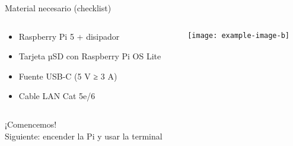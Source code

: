\documentclass[aspectratio=169, professionalfonts]{beamer}
\begin{document}
\begin{frame}{Material necesario (checklist)}
  \begin{columns}[T]
    \begin{column}{0.48\textwidth}
      \begin{itemize}
        \item Raspberry Pi 5 + disipador
        \item Tarjeta µSD con Raspberry Pi OS Lite
        \item Fuente USB-C (5 V ≥ 3 A)
        \item Cable LAN Cat 5e/6
      \end{itemize}
    \end{column}
    \begin{column}{0.48\textwidth}
      \texttt{[image: example-image-b]}
    \end{column}
  \end{columns}
\end{frame}

\begin{frame}%
  ¡Comencemos!\\
  \small Siguiente: encender la Pi y usar la terminal
\end{frame}
\end{document}
